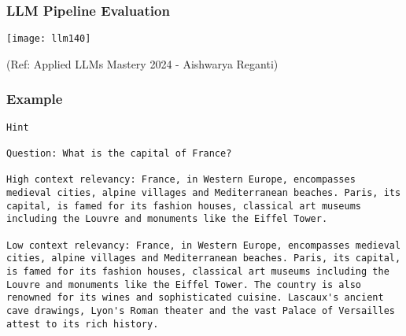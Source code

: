 \begin{frame}[fragile]\frametitle{LLM Pipeline Evaluation}

\begin{center}
\texttt{[image: llm140]}
\end{center}				

{\tiny (Ref: Applied LLMs Mastery 2024 - Aishwarya Reganti)}  
\end{frame}




\begin{frame}[fragile]\frametitle{Example}
  
\begin{lstlisting}
Hint

Question: What is the capital of France?

High context relevancy: France, in Western Europe, encompasses medieval cities, alpine villages and Mediterranean beaches. Paris, its capital, is famed for its fashion houses, classical art museums including the Louvre and monuments like the Eiffel Tower.

Low context relevancy: France, in Western Europe, encompasses medieval cities, alpine villages and Mediterranean beaches. Paris, its capital, is famed for its fashion houses, classical art museums including the Louvre and monuments like the Eiffel Tower. The country is also renowned for its wines and sophisticated cuisine. Lascaux's ancient cave drawings, Lyon's Roman theater and the vast Palace of Versailles attest to its rich history.

\end{lstlisting}  
			

\end{frame}

